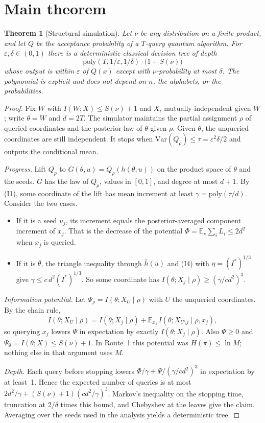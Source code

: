 \documentclass[11pt]{article}
\newtheorem{theorem}{Theorem}\newtheorem{corollary}[theorem]{Corollary}
\theoremstyle{definition}\newtheorem{definition}[theorem]{Definition}\newtheorem{problem}{Open Problem}
\theoremstyle{remark}\newtheorem{remark}[theorem]{Remark}
\newcommand{\E}{\mathbb{E}}\newcommand{\poly}{\mathrm{poly}}
\begin{document}
\section{Main theorem}
\begin{theorem}[Structural simulation]\label{thm:main}
Let $\nu$ be any distribution on a finite product, and let $Q$ be the acceptance probability of a $T$-query quantum algorithm. For $\varepsilon,\delta\in(0,1)$ there is a deterministic classical decision tree of depth
\[ \poly(T,1/\varepsilon,1/\delta)\cdot\bigl(1+S(\nu)\bigr) \]
whose output is within $\varepsilon$ of $Q(x)$ except with $\nu$-probability at most $\delta$. The polynomial is explicit and does not depend on $n$, the alphabets, or the probabilities.
\end{theorem}
\begin{proof}
Fix $W$ with $I(W;X)\le S(\nu)+1$ and $X_i$ mutually independent given $W$; write $\theta=W$ and $d=2T$. The simulator maintains the partial assignment $\rho$ of queried coordinates and the posterior law of $\theta$ given $\rho$. Given $\theta$, the unqueried coordinates are still independent. It stops when $\mathrm{Var}(Q_\rho)\le\tau=\varepsilon^2\delta/2$ and outputs the conditional mean.

\emph{Progress.} Lift $Q_\rho$ to $G(\theta,u)=Q_\rho(h(\theta,u))$ on the product space of $\theta$ and the seeds. $G$ has the law of $Q_\rho$, values in $[0,1]$, and degree at most $d+1$. By (I1), some coordinate of the lift has mean increment at least $\gamma=\poly(\tau/d)$. Consider the two cases.
\begin{itemize}[nosep]
\item If it is a seed $u_j$, its increment equals the posterior-averaged component increment of $x_j$. That is the decrease of the potential $\Phi=\E_\pi\sum_i L_i\le 2d^2$ when $x_j$ is queried.
\item If it is $\theta$, the triangle inequality through $\bar h(u)$ and (I4) with $\eta=(I^*)^{1/3}$ give $\gamma\le c\,d^2 (I^*)^{1/3}$. So some coordinate has $I(\theta;X_j\mid\rho)\ge(\gamma/cd^2)^3$.
\end{itemize}

\emph{Information potential.} Let $\Psi_\rho=I(\theta;X_{U}\mid\rho)$ with $U$ the unqueried coordinates. By the chain rule,
\[ I(\theta;X_U\mid\rho)=I(\theta;X_j\mid\rho)+\E_{x_j}\,I(\theta;X_{U\setminus j}\mid\rho,x_j), \]
so querying $x_j$ lowers $\Psi$ in expectation by exactly $I(\theta;X_j\mid\rho)$. Also $\Psi\ge0$ and $\Psi_\emptyset=I(\theta;X)\le S(\nu)+1$. In Route~1 this potential was $H(\pi)\le\ln M$; nothing else in that argument uses $M$.

\emph{Depth.} Each query before stopping lowers $\Phi/\gamma+\Psi/(\gamma/cd^2)^3$ in expectation by at least~1. Hence the expected number of queries is at most $2d^2/\gamma+(S(\nu)+1)(cd^2/\gamma)^3$. Markov's inequality on the stopping time, truncation at $2/\delta$ times this bound, and Chebyshev at the leaves give the claim. Averaging over the seeds used in the analysis yields a deterministic tree.
\end{proof}
\end{document}
